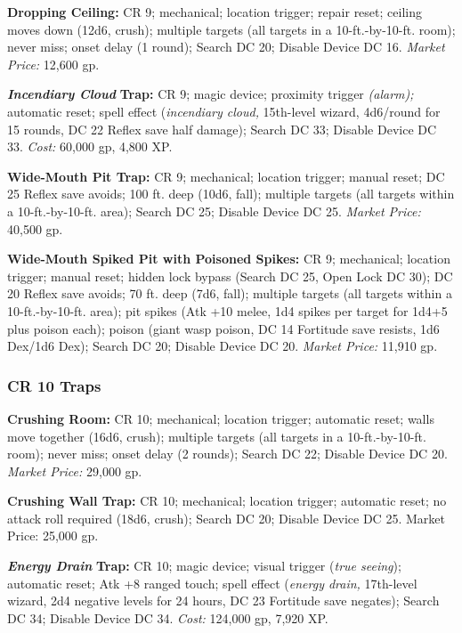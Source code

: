 \documentclass{article}
\begin{document}
\textbf{Dropping Ceiling:} CR 9; mechanical; location trigger; repair reset; ceiling 
moves down (12d6, crush); multiple targets (all targets in a 10-ft.-by-10-ft. room); 
never miss; onset delay (1 round); Search DC 20; Disable Device DC 16. \textit{Market 
Price: }12,600 gp. 

\textit{\textbf{Incendiary Cloud }}\textbf{Trap:} CR 9; magic device; proximity 
trigger \textit{(alarm); }automatic reset; spell effect (\textit{incendiary cloud, 
}15th-level wizard, 4d6/round for 15 rounds, DC 22 Reflex save half damage); Search 
DC 33; Disable Device DC 33. \textit{Cost: }60,000 gp, 4,800 XP. 

\textbf{Wide-Mouth Pit Trap:} CR 9; mechanical; location trigger; manual reset; 
DC 25 Reflex save avoids; 100 ft. deep (10d6, fall); multiple targets (all targets 
within a 10-ft.-by-10-ft. area); Search DC 25; Disable Device DC 25. \textit{Market 
Price: }40,500 gp. 

\textbf{Wide-Mouth Spiked Pit with Poisoned Spikes:} CR 9; mechanical; location 
trigger; manual reset; hidden lock bypass  (Search DC 25, Open Lock DC 30); DC 
20 Reflex save avoids; 70 ft. deep (7d6, fall); multiple targets (all targets within 
a 10-ft.-by-10-ft. area); pit spikes (Atk +10 melee, 1d4 spikes per target for 
1d4+5 plus poison each); poison (giant wasp poison, DC 14 Fortitude save resists, 
1d6 Dex/1d6 Dex); Search DC 20; Disable Device DC 20. \textit{Market Price: }11,910 
gp.

\vspace{12pt}
\subsubsection*{\textbf{CR 10 Traps}}

\textbf{Crushing Room:} CR 10; mechanical; location trigger; automatic reset; walls 
move together (16d6, crush); multiple targets (all targets in a 10-ft.-by-10-ft. 
room); never miss; onset delay (2 rounds); Search DC 22; Disable Device DC 20. 
\textit{Market Price: }29,000 gp.

\textbf{Crushing Wall Trap:} CR 10; mechanical; location trigger; automatic reset; 
no attack roll required (18d6, crush); Search DC 20; Disable Device DC 25. Market 
Price: 25,000 gp. 

\textit{\textbf{Energy Drain }}\textbf{Trap:} CR 10; magic device; visual trigger 
(\textit{true seeing}); automatic reset; Atk +8 ranged touch; spell effect (\textit{energy 
drain, }17th-level wizard, 2d4 negative levels for 24 hours, DC 23 Fortitude save 
negates); Search DC 34; Disable Device DC 34. \textit{Cost: }124,000 gp, 7,920 
XP.
\end{document}
